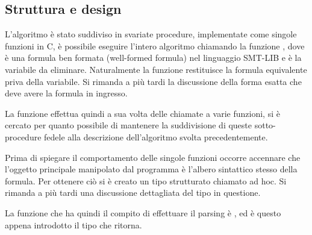 \documentclass[11pt,letterpaper,twoside]{article}
\begin{document}
\subsection{Struttura e design}

\begin{center}
\end{center}

L'algoritmo \`e stato suddiviso in svariate procedure, implementate come singole
funzioni in C, è possibile eseguire l'intero algoritmo chiamando la funzione
, dove  è una formula ben
formata (well-formed formula) nel linguaggio SMT-LIB\autocite{smtlib} e
 è la variabile da eliminare.
Naturalmente la funzione restituisce la formula equivalente priva della
variabile.
Si rimanda a più tardi la discussione della forma esatta che deve avere la
formula in ingresso.

La funzione  effettua quindi a sua volta delle chiamate a varie
funzioni, si è cercato per quanto possibile di mantenere la suddivisione di
queste sotto-procedure fedele alla descrizione dell'algoritmo svolta
precedentemente.


Prima di spiegare il comportamento delle singole funzioni occorre accennare che
l'oggetto principale manipolato dal programma è l'albero sintattico stesso della
formula. Per ottenere ciò si è creato un tipo strutturato chiamato
 ad hoc. Si rimanda a più tardi una discussione
dettagliata del tipo in questione.

La funzione che ha quindi il compito di effettuare il parsing è
, ed è questo appena introdotto il tipo
che ritorna.
\end{document}
